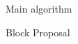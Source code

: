 \documentclass[10pt,a4paper]{article}
\begin{document}
\begin{section}{Main algorithm}
\begin{subsection}{Block Proposal}







\end{subsection}
\end{section}
\end{document}
